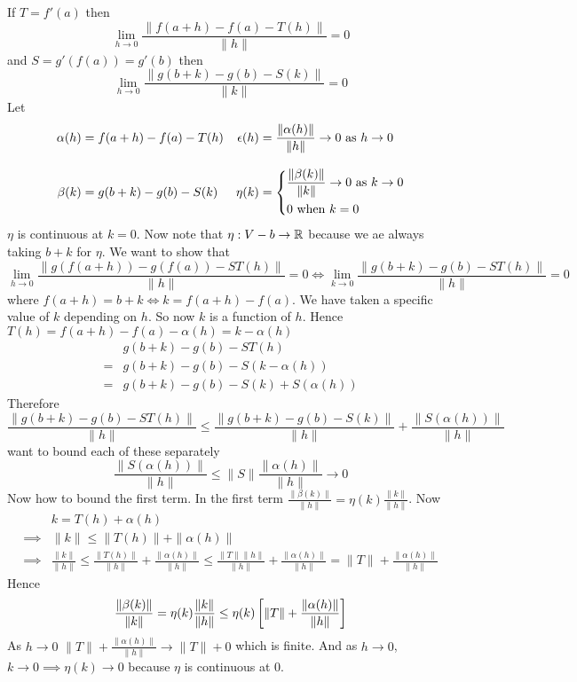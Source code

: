 \begin{myproof}
	If $T=f'(a)$ then $$\lim_{h\to 0}\frac{\|f(a+h)-f(a)-T(h)\|}{\|h\|}=0$$and $S=g'(f(a))=g'(b)$ then $$ \lim_{h\to 0}\frac{\|g(b+k)-g(b)-S(k)\|}{\|k\|}=0$$Let \begin{align*}
		\alpha(h) & = f(a+h)-f(a)-T(h) & \eps(h) & = \frac{\|\alpha(h)\|}{\|h\|}\to 0\text{ as }h\to 0  \\[3mm]
		\beta(k)  & = g(b+k)-g(b)-S(k) & \eta(k) & = \begin{cases*}
			                                             \dfrac{\|\beta(k)\|}{\|k\|}\to0  \text{ as }k\to 0 \\
			                                             0      \text{ when }                         k=0
		                                             \end{cases*}
	\end{align*}
	$\eta$ is continuous at $k=0$. Now note that $\eta:V-b\to \mathbb{R}$ because we ae always taking $b+k$ for $\eta$. We want to show that \[\lim_{h\to 0}\frac{\|g(f(a+h))-g(f(a))-ST(h)\|}{\|h\|}=0\iff \lim_{k\to 0}\frac{\|g(b+k)-g(b)-ST(h)\|}{\|h\|}=0\]where $f(a+h)=b+k\iff k=f(a+h)-f(a)$. We have taken a specific value of $k$ depending on $h$. So now $k$ is a function of $h$. Hence $T(h)=f(a+h)-f(a)-\alpha(h)=k-\alpha(h)$
	\begin{align*}
		  & g(b+k) -g(b) -ST(h)           \\
		= & g(b+k) -g(b) -S(k-\alpha(h))  \\
		= & g(b+k)-g(b)-S(k)+S(\alpha(h))
	\end{align*}Therefore\[ \frac{\|g(b+k)-g(b)-ST(h)\|}{\|h\|}\leq \frac{\|g(b+k)-g(b)-S(k)\|}{\|h\|}+\frac{\|S(\alpha(h))\|}{\|h\|}\] want to bound each of these separately
	\[\frac{\|S(\alpha(h))\|}{\|h\|}\leq \|S\|\frac{\|\alpha(h)\|}{\|h\|}\to 0\]Now how to bound the first term. In the first term $\frac{\|\beta(k)\|}{\|h\|}=\eta(k)\frac{\|k\|}{\|h\|}$. Now \begin{align*}
		         & k=T(h)+\alpha(h)                                                                                                                                                        \\
		\implies & \|k\|\leq \|T(h)\|+\|\alpha(h)\|                                                                                                                                        \\
		\implies & \frac{\|k\|}{\|h\|}\leq \frac{\|T(h)\|}{\|h\|}+\frac{\|\alpha(h)\|}{\|h\|}\leq \frac{\|T\|\|h\|}{\|h\|}+\frac{\|\alpha(h)\|}{\|h\|} = \|T\|+\frac{\|\alpha(h)\|}{\|h\|}
	\end{align*}Hence $$\frac{\|\beta(k)\|}{\|k\|}=\eta(k)\frac{\|k\|}{\|h\|}\leq \eta(k)\left[\|T\|+\frac{\|\alpha(h)\|}{\|h\|}\right]$$As $h\to 0$ $\|T\|+\frac{\|\alpha(h)\|}{\|h\|}\to \|T\|+0$ which is finite. And as $h\to 0$, $k\to 0\implies \eta(k)\to 0$ because $\eta$ is continuous at 0.
\end{myproof}

